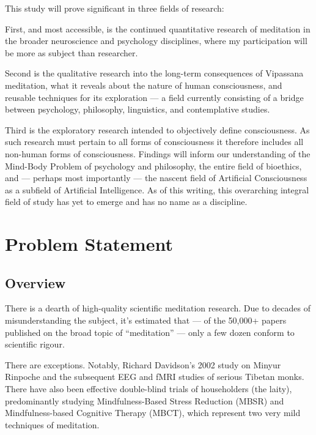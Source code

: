 \documentclass[a4paper, amsfonts, amssymb, amsmath, reprint, showkeys, nofootinbib, twoside]{revtex4-1}
\begin{document}
This study will prove significant in three fields of research:

First, and most accessible, is the continued quantitative research of meditation in
the broader neuroscience and psychology disciplines, where my participation will be
more as subject than researcher.

Second is the qualitative research into the long-term consequences of
Vipassana meditation, what it reveals about the nature of human consciousness, and
reusable techniques for its exploration --- a field currently consisting of a bridge
between psychology, philosophy, linguistics, and contemplative studies.

Third is the exploratory research intended to objectively define
consciousness. As such research must pertain to all forms of consciousness it
therefore includes all non-human forms of consciousness. Findings will inform our
understanding of the Mind-Body Problem of psychology and philosophy, the entire field
of bioethics, and --- perhaps most importantly --- the nascent field of Artificial
Consciousness as a subfield of Artificial Intelligence. \cite{hildt2019artificial} As of this
writing, this overarching integral field of study has yet to emerge and has no name
as a discipline.

\section{Problem Statement}

\subsection{Overview}

There is a dearth of high-quality scientific meditation research.
Due to decades of misunderstanding the subject, it's estimated that
--- of the 50,000+ papers published on the broad topic of ``meditation'' ---
only a few dozen conform to scientific rigour.
\cite{goleman2017altered,semanticscholar2024meditation}

There are exceptions. Notably, Richard Davidson's 2002 study on Minyur Rinpoche and
the subsequent EEG and fMRI studies of serious Tibetan monks.
\cite{https://doi.org/10.1073/pnas.0407401101}
There have also been effective double-blind trials of householders (the laity),
predominantly studying Mindfulness-Based Stress Reduction (MBSR) and
Mindfulness-based Cognitive Therapy (MBCT), which represent two very mild
techniques of meditation.
\end{document}
